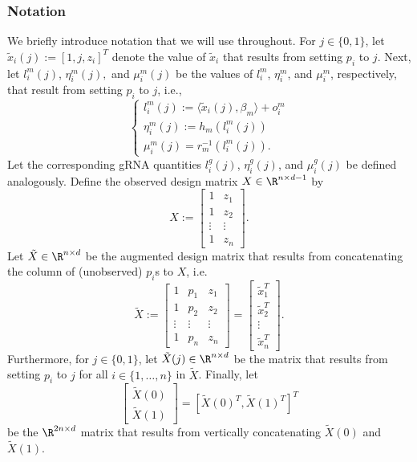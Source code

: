\documentclass[12pt]{article}
\begin{document}
\subsubsection*{Notation}
We briefly introduce notation that we will use throughout. For $j \in \{0,1\}$, let $\tilde{x}_i(j) := [1, j, z_i]^T$ denote the value of $\tilde{x}_i$ that results from setting $p_i$ to $j$. Next, let  $l^m_i(j)$, $\eta^m_i(j),$ and $\mu^m_i(j)$ be the values of $l^m_i$, $\eta^m_i$, and $\mu^m_i$, respectively, that result from setting $p_i$ to $j$, i.e.,
$$
\begin{cases}
l^m_i(j) := \langle \tilde{x}_i(j), \beta_m \rangle + o^m_i \\ \eta^m_i(j) := h_m(l^m_i(j)) \\
\mu_i^m(j) = r_m^{-1}(l^m_i(j)).
\end{cases}
$$
Let the corresponding gRNA quantities $l^g_i(j)$, $\eta_i^g(j)$, and $\mu^g_i(j)$ be defined analogously. Define the observed design matrix $X \in  \R^{n \times {d-1}}$ by 
$$X := \begin{bmatrix} 
1 & z_1 \\
1 & z_2 \\
\vdots & \vdots \\
1 & z_n
\end{bmatrix}.$$ 
Let $\tilde{X} \in \R^{n \times d}$ be the augmented design matrix that results from concatenating the column of (unobserved) $p_i$s to $X$, i.e.
$$ \tilde{X}  := 
\begin{bmatrix}
1 & p_1 & z_1 \\
1 & p_2 & z_2 \\ 
\vdots & \vdots & \vdots \\
1 & p_n & z_n
\end{bmatrix} = \begin{bmatrix}
\tilde{x}_1^T \\ \tilde{x}_2^T \\ \vdots \\ \tilde{x}_n^T
\end{bmatrix}.$$ Furthermore, for $j \in \{0,1\}$, let $\tilde{X}(j) \in \R^{n \times d}$ be the matrix that results from setting $p_i$ to $j$ for all $i \in \{1, \dots, n\}$ in $\tilde{X}$. Finally, let $$\begin{bmatrix} \tilde{X}(0) \\ \tilde{X}(1) \end{bmatrix} = [\tilde{X}(0)^T, \tilde{X}(1)^T]^T$$ be the $\R^{2n \times d}$ matrix that results from vertically concatenating $\tilde{X}(0)$ and $\tilde{X}(1)$.
\end{document}
